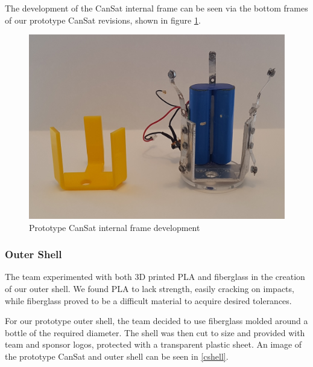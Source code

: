 \documentclass[]{report}
\begin{document}
		 The development of the CanSat internal frame can be seen via the bottom frames of our prototype CanSat revisions, shown in figure \ref{ointframedev}.
		 
		 
		 \begin{figure}[h]
		 	\hfill\includegraphics[scale=0.15]{old_frame.jpg}\hspace*{\fill}
		 	\caption{Prototype CanSat internal frame development}
		 	\label{ointframedev}
		 \end{figure}
	 	\subsubsection{Outer Shell}
	 	The team experimented with both 3D printed PLA and fiberglass in the creation of our outer shell. We found PLA to lack strength, easily cracking on impacts, while fiberglass proved to be a difficult material to acquire desired tolerances.
	 	
	 	For our prototype outer shell, the team decided to use fiberglass molded around a bottle of the required diameter. The shell was then cut to size and provided with team and sponsor logos, protected with a transparent plastic sheet. An image of the prototype CanSat and outer shell can be seen in \ref{cshell}. 
	 	
\end{document}
